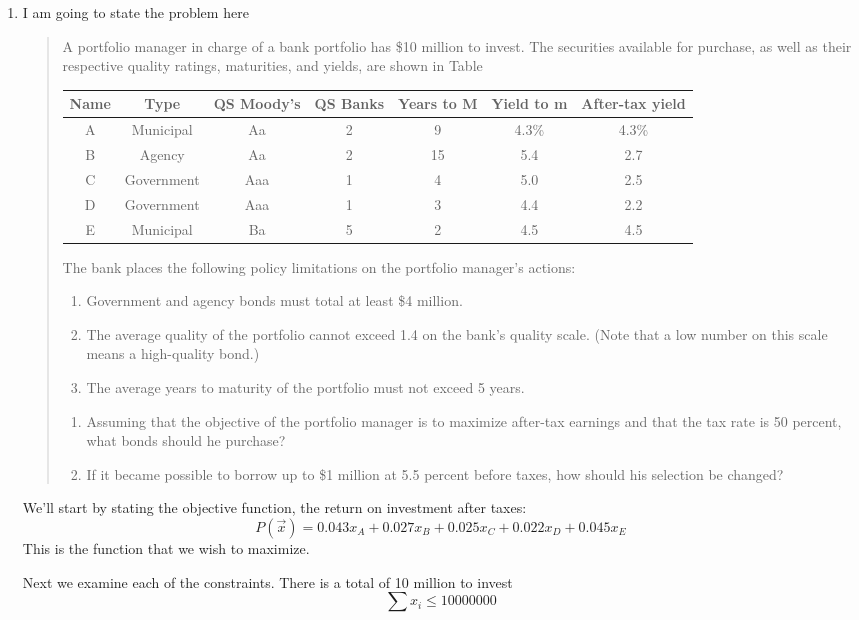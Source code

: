 \documentclass[11pt]{article}
\begin{document}
\begin{enumerate}
\begin{tabular}{l|l|l|l}
\end{tabular}

\item I am going to state the problem here
\begin{quote}
A portfolio manager in charge of a bank portfolio has \$10 million to invest. The
securities available for purchase, as well as their respective quality ratings, maturities, and yields, are shown
in Table

\begin{tabular}{c|c|c|c|c|c|c}
Name & Type & QS Moody's & QS Banks& Years to M & Yield to m& After-tax yield\\\hline
A& Municipal& Aa &2& 9& 4.3\% &4.3\%\\
B& Agency& Aa& 2& 15& 5.4& 2.7\\
C& Government& Aaa &1 &4 &5.0 &2.5\\
D &Government &Aaa& 1& 3& 4.4& 2.2\\
E& Municipal &Ba &5 &2 &4.5 &4.5
\end{tabular}

The bank places the following policy limitations on the portfolio manager’s actions:
\begin{enumerate}
\item Government and agency bonds must total at least \$4 million.
\item  The average quality of the portfolio cannot exceed 1.4 on the bank’s quality scale. (Note that a low
number on this scale means a high-quality bond.)
\item  The average years to maturity of the portfolio must not exceed 5 years.
\end{enumerate}

\begin{enumerate}
\item Assuming that the objective of the portfolio manager is to maximize after-tax earnings and that the tax rate is 50 percent, what bonds should he purchase? 
\item If it became possible to borrow up to \$1 million at 5.5 percent before taxes, how should his selection be changed?
\end{enumerate}
\end{quote}

We'll start by stating the objective function, the return on investment after taxes:
\[
P(\vec x) = 0.043x_A + 0.027 x_B + 0.025 x_C + 0.022 x_D + 0.045 x_E
\]
This is the function that we wish to maximize.

Next we examine each of the constraints.
There is a total of 10 million to invest
\[
\sum x_i \leq 10 000 000
\]


\end{enumerate}
\end{document}
